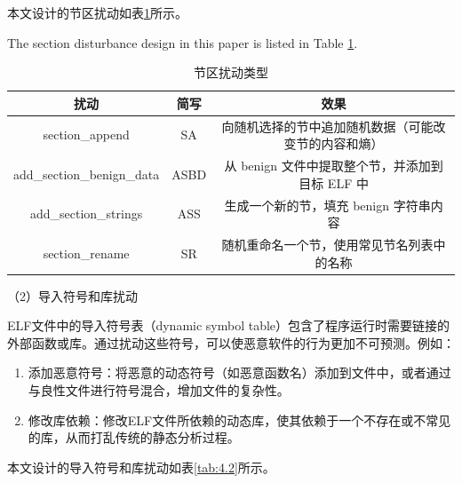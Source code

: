 本文设计的节区扰动如表\ref{tab:4.1}所示。

The section disturbance design in this paper is listed in Table \ref{tab:4.1}.

\begin{table}[htbp]
	\centering
	\caption{节区扰动类型}\label{tab:4.1}
	\begin{tabular*}{\textwidth}{@{\extracolsep{\fill}}ccc}
		\toprule
		扰动 & 简写 & 效果 \\
		\midrule
		section\_append & SA & 向随机选择的节中追加随机数据（可能改变节的内容和熵） \\
		add\_section\_benign\_data & ASBD & 从 benign 文件中提取整个节，并添加到目标 ELF 中 \\
		add\_section\_strings & ASS & 生成一个新的节，填充 benign 字符串内容 \\
		section\_rename & SR & 随机重命名一个节，使用常见节名列表中的名称 \\
		\bottomrule
	\end{tabular*}
\end{table}


（2）导入符号和库扰动


ELF文件中的导入符号表（dynamic symbol table）包含了程序运行时需要链接的外部函数或库。通过扰动这些符号，可以使恶意软件的行为更加不可预测。例如：
\begin{enumerate}
	


\item 添加恶意符号：将恶意的动态符号（如恶意函数名）添加到文件中，或者通过与良性文件进行符号混合，增加文件的复杂性。


\item 修改库依赖：修改ELF文件所依赖的动态库，使其依赖于一个不存在或不常见的库，从而打乱传统的静态分析过程。

\end{enumerate}
本文设计的导入符号和库扰动如表\ref{tab:4.2}所示。

